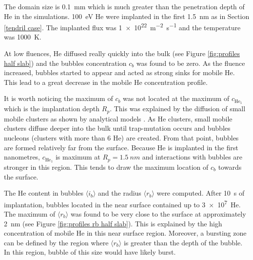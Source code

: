 The domain size is \SI{0.1}{mm} which is much greater than the penetration depth of He in the simulations.
\SI{100}{eV} He were implanted in the first \SI{1.5}{nm} as in Section \ref{tendril case}.
The implanted flux was \SI{1e22}{m^{-2} s^{-1}} and the temperature was \SI{1000}{K}.

At low fluences, He diffused really quickly into the bulk (see Figure \ref{fig:profiles half slab}) and the bubbles concentration $c_b$ was found to be zero.
As the fluence increased, bubbles started to appear and acted as strong sinks for mobile He.
This lead to a great decrease in the mobile He concentration profile.

It is worth noticing the maximum of $c_b$ was not located at the maximum of $c_{\mathrm{He}_1}$ which is the implantation depth $R_p$.
This was explained by the diffusion of small mobile clusters as shown by analytical models .
As He clusters, small mobile clusters diffuse deeper into the bulk until trap-mutation occurs and bubbles nucleons (clusters with more than 6 He) are created.
From that point, bubbles are formed relatively far from the surface.
Because He is implanted in the first nanometres, $c_{\mathrm{He}_1}$ is maximum at $R_p = \SI{1.5}{nm}$ and interactions with bubbles are stronger in this region.
This tends to draw the maximum location of $c_b$ towards the surface.

The He content in bubbles $\langle i_b \rangle$ and the radius $\langle r_b \rangle$ were computed.
After \SI{10}{s} of implantation, bubbles located in the near surface contained up to \SI{3e7}{He}.
The maximum of $\langle r_b \rangle$ was found to be very close to the surface at approximately \SI{2}{nm} (see Figure \ref{fig:profiles rb half slab}).
This is explained by the high concentration of mobile He in this near surface region.
Moreover, a bursting zone can be defined by the region where $\langle r_b \rangle$ is greater than the depth of the bubble.
In this region, bubble of this size would have likely burst.

